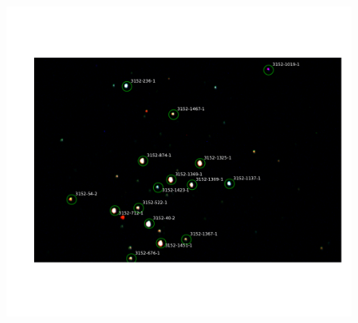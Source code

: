\documentclass[%
aip,
jmp,
reprint,
floatfix
]{revtex4-1}
\begin{document}
	\begin{figure}
		\includegraphics[width=\textwidth]{figs/map.pdf}
	\end{figure}
\end{document}
